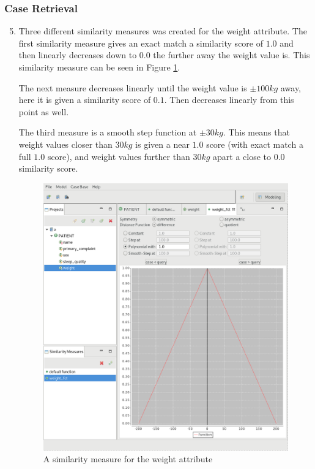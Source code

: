 \documentclass[a4paper]{article}
\begin{document}
\subsubsection*{Case Retrieval}
    \begin{enumerate}[label=\alph*)]
        \setcounter{enumi}{4}
        \item

            Three different similarity measures was created for the weight
            attribute. The first similarity measure gives an exact match a
            similarity score of $1.0$ and then linearly decreases down to $0.0$ the
            further away the weight value is. This similarity measure can be
            seen in Figure \ref{fig:similarity_function}.

            The next measure decreases linearly until the weight value is $±100
            kg$ away, here it is given a similarity score of $0.1$. Then decreases
            linearly from this point as well.

            The third measure is a smooth step function at $±30 kg$. This means
            that weight values closer than $30 kg$ is given a near $1.0$ score (with
            exact match a full $1.0$ score), and weight values further than $30 kg$
            apart a close to $0.0$ similarity score.

            \begin{figure}[H]
                \centering
                \includegraphics[width=0.7\linewidth]{similarity_function.png}
                \caption{A similarity measure for the weight attribute}
                \label{fig:similarity_function}
            \end{figure}


\end{enumerate}
\end{document}
